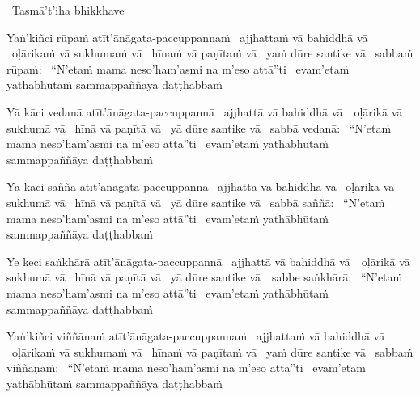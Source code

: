 \begin{pali-leader}
  \anglebracketleft\ \hspace{-0.5mm}Tasmā't'iha bhikkhave \hspace{-0.5mm}\anglebracketright\
\end{pali-leader}
\begin{pali-hangtogether}
  Yaṅ'kiñci rūpaṁ atīt'ānāgata-paccuppannaṁ \breathmark\ ajjhattaṁ vā bahiddhā vā \breathmark\ oḷārikaṁ vā sukhumaṁ vā \breathmark\ hīnaṁ vā paṇītaṁ vā \breathmark\ yaṁ dūre santike vā \breathmark\ sabbaṁ rūpaṁ: \breathmark\ ``N'etaṁ mama neso'ham'asmi na m'eso attā''ti \breathmark\ evam'etaṁ yathābhūtaṁ sammappaññāya daṭṭhabbaṁ
\end{pali-hangtogether}

\begin{pali-hang}
  Yā kāci vedanā atīt'ānāgata-paccuppannā \breathmark\ ajjhattā vā bahiddhā \mbox{vā}~\breathmark\ oḷārikā vā sukhumā vā \breathmark\ hīnā vā paṇītā vā \breathmark\ yā dūre santike vā \breathmark\ sabbā vedanā: \breathmark\ ``N'etaṁ mama neso'ham'asmi na m'eso attā''ti \breathmark\ evam'etaṁ yathābhūtaṁ sammappaññāya daṭṭhabbaṁ
\end{pali-hang}

\begin{pali-hang}
  Yā kāci saññā atīt'ānāgata-paccuppannā \breathmark\ ajjhattā vā bahiddhā vā \breathmark\ oḷārikā vā sukhumā vā \breathmark\ hīnā vā paṇītā vā \breathmark\ yā dūre santike vā \breathmark\ sabbā saññā: \breathmark\ ``N'etaṁ mama neso'ham'asmi na m'eso attā''ti \breathmark\ evam'etaṁ yathābhūtaṁ sammappaññāya daṭṭhabbaṁ
\end{pali-hang}

\begin{pali-hang}
  Ye keci saṅkhārā atīt'ānāgata-paccuppannā \breathmark\ ajjhattā vā bahiddhā \mbox{vā}~\breathmark\ oḷārikā vā sukhumā vā \breathmark\ hīnā vā paṇītā vā \breathmark\ yā dūre santike \mbox{vā}~\breathmark\ sabbe saṅkhārā: \breathmark\ ``N'etaṁ mama neso'ham'asmi na m'eso attā''ti \breathmark\ evam'etaṁ yathābhūtaṁ sammappaññāya daṭṭhabbaṁ
\end{pali-hang}

\begin{pali-hang}
  Yaṅ'kiñci viññāṇaṁ atīt'ānāgata-paccuppannaṁ \breathmark\ ajjhattaṁ vā bahiddhā vā \breathmark\ oḷārikaṁ vā sukhumaṁ vā \breathmark\ hīnaṁ vā paṇītaṁ vā \breathmark\ yaṁ dūre santike vā \breathmark\ sabbaṁ viññāṇaṁ: \breathmark\ ``N'etaṁ mama neso'ham'asmi na m'eso attā''ti \breathmark\ evam'etaṁ yathābhūtaṁ sammappaññāya daṭṭhabbaṁ
\end{pali-hang}

